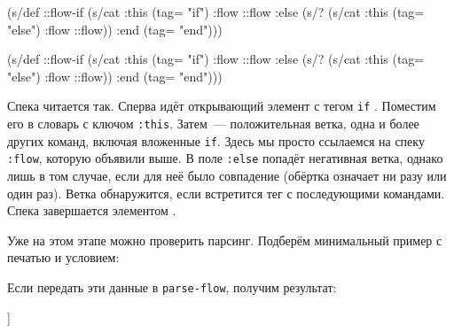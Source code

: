 \ifnarrow


\begin{clojure/lines}
(s/def ::flow-if
  (s/cat
    :this (tag= "if")
    :flow ::flow
    :else (s/? (s/cat
                 :this (tag= "else")
                 :flow ::flow))
    :end (tag= "end")))
\end{clojure/lines}


\else


\begin{clojure/lines}
(s/def ::flow-if
  (s/cat :this (tag= "if")
         :flow ::flow
         :else (s/? (s/cat :this (tag= "else")
                           :flow ::flow))
         :end (tag= "end")))
\end{clojure/lines}


\fi

Спека читается так. Сперва идёт открывающий элемент с тегом \texttt{if}
. Поместим его в словарь с ключом
\texttt{:this}. Затем~--- положительная ветка, одна и более других команд,
включая вложенные \texttt{if}.  Здесь мы просто ссылаемся на спеку
\texttt{:flow}, которую объявили выше. В поле \texttt{:else}
 попадёт негативная ветка, однако лишь в том
случае, если для неё было совпадение (обёртка  означает ни разу или
один раз). Ветка обнаружится, если встретится тег  с последующими
командами. Спека завершается элементом .

Уже на этом этапе можно проверить парсинг. Подберём минимальный пример с печатью
и условием:

\ifnarrow


\begin{clojure}
\end{clojure}


\else


\begin{clojure}
\end{clojure}


\fi

Если передать эти данные в \texttt{parse-flow}, получим результат:



\begin{clojure}
[[:if
  {:this {:command "if" :condition "..."}
   :flow [[:cmd {:command "print"
                 :text "True"}]]
   :else
   {:this {:command "else"}
    :flow [[:cmd {:command "print"
                  :text "False"}]]}
   :end {:command "end"}}]]
\end{clojure}


